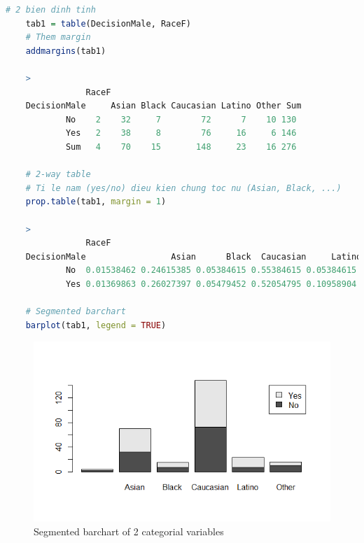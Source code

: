 \documentclass[a4paper,12pt]{article}
\begin{document}
	
	\begin{lstlisting}[language = R]
	# 2 bien dinh tinh
	tab1 = table(DecisionMale, RaceF)
	# Them margin
	addmargins(tab1)
	
	>
	            RaceF
	DecisionMale     Asian Black Caucasian Latino Other Sum
			No    2    32     7        72      7    10 130
			Yes   2    38     8        76     16     6 146
			Sum   4    70    15       148     23    16 276
	
	# 2-way table
	# Ti le nam (yes/no) dieu kien chung toc nu (Asian, Black, ...)
	prop.table(tab1, margin = 1)
	
	>
	            RaceF
	DecisionMale                 Asian      Black  Caucasian     Latino      Other
			No  0.01538462 0.24615385 0.05384615 0.55384615 0.05384615 0.07692308
			Yes 0.01369863 0.26027397 0.05479452 0.52054795 0.10958904 0.04109589
	
	# Segmented barchart
	barplot(tab1, legend = TRUE)
	\end{lstlisting}
	
	\begin{figure}[H]
		\centering
		\includegraphics[width=0.7\linewidth]{Images/drplot}
		\caption{Segmented barchart of 2 categorial variables}
		\label{fig:drplot}
	\end{figure}
	
\end{document}
